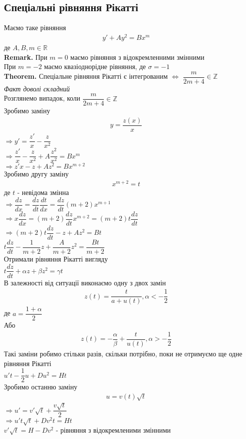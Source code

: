 \documentclass[a4paper, 14pt]{extarticle}
\def\bigline{\vspace{5mm}\\}
\begin{document}
\subsection{Спеціальні рівняння Рікатті}
Маємо таке рівняння
\begin{align*}
y' + Ay^2 = Bx^m
\end{align*}
де $A,B, m \in \mathbb{R}$
\bigline
\textbf{Remark.} При $m = 0$ маємо рівняння з відокремленними змінними\\
При $m = -2$ маємо квазіоднорідне рівняння, де $\sigma = -1$
\bigline
\textbf{Theorem.} Спеціальне рівняння Рікатті є інтегрованим $\iff$ $\dfrac{m}{2m+4} \in \mathbb{Z}$\\
\textit{Факт доволі складний}
\bigline

Розглянемо випадок, коли $\dfrac{m}{2m+4} \in \mathbb{Z}$\\
Зробимо заміну
\begin{align*}
y = \dfrac{z(x)}{x}
\end{align*}
$\Rightarrow y' = \dfrac{z'}{x} - \dfrac{z}{x^2}$\\
$\Rightarrow \dfrac{z'}{x} - \dfrac{z}{x^2} + A \dfrac{z^2}{x^2} = Bx^m$\\
$\Rightarrow z'x - z + Az^2 = Bx^{m+2}$\\
Зробимо другу заміну
\begin{align*}
x^{m+2} = t
\end{align*}
де $t$ - невідома змінна\\
$\Rightarrow \dfrac{dz}{dx} = \dfrac{dz}{dt} \dfrac{dt}{dx} = \dfrac{dz}{dt} (m+2)x^{m+1}$\\
$\Rightarrow x \dfrac{dz}{dx} = (m+2) \dfrac{dz}{dt} x^{m+2} = (m+2)t \dfrac{dz}{dt}$\\
$\Rightarrow (m+2)t \dfrac{dz}{dt} - z + Az^2 = Bt$\\
$t \dfrac{dz}{dt} - \dfrac{1}{m+2}z + \dfrac{A}{m+2}z^2 = \dfrac{Bt}{m+2}$\\
Отримали рівняння Рікатті вигляду\\
$t \dfrac{dz}{dt} + \alpha z + \beta z^2 = \gamma t$\\
В залежності від ситуації виконаємо одну з двох замін
\begin{align*}
z(t) = \dfrac{t}{a+u(t)}, \alpha < -\dfrac{1}{2}
\end{align*}
де $a = \dfrac{1+\alpha}{2}$\\
Або
\begin{align*}
z(t) = -\dfrac{\alpha}{\beta} + \dfrac{t}{u(t)}, \alpha > -\dfrac{1}{2}
\end{align*}
Такі заміни робимо стільки разів, скільки потрібно, поки не отримуємо ще одне рівняння Рікатті\\
$u't - \dfrac{1}{2}u + Du^2 = Ht$\\
Зробимо останню заміну
\begin{align*}
u = v(t) \sqrt{t}
\end{align*}
$\Rightarrow u' = v' \sqrt{t} + \dfrac{v \sqrt{t}}{2}$\\
$\Rightarrow u' t \sqrt{t} + Dv^2t = Ht$\\
$v' \sqrt{t} = H - Dv^2$ - рівняння з відокремленими змінними
\bigline
\end{document}
